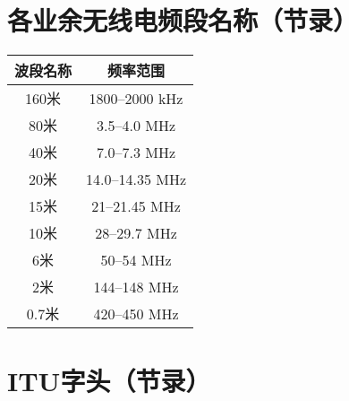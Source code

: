 \newpage






\section{各业余无线电频段名称（节录）}


\begin{longtable}{|c|c|}
	\hline
	\textbf{波段名称} & \textbf{频率范围} \\
	\hline
	160米 & 1800–2000 kHz \\
	\hline
	80米 & 3.5–4.0 MHz \\
	\hline
	40米 & 7.0–7.3 MHz \\
	\hline
	20米 & 14.0–14.35 MHz \\
	\hline
	15米 & 21–21.45 MHz \\
	\hline
	10米 & 28–29.7 MHz \\
	\hline
	6米 & 50–54 MHz \\
	\hline
	2米 & 144–148 MHz \\
	\hline
	0.7米 & 420–450 MHz \\
	\hline
\end{longtable}

\newpage








\section{ITU字头（节录）}


